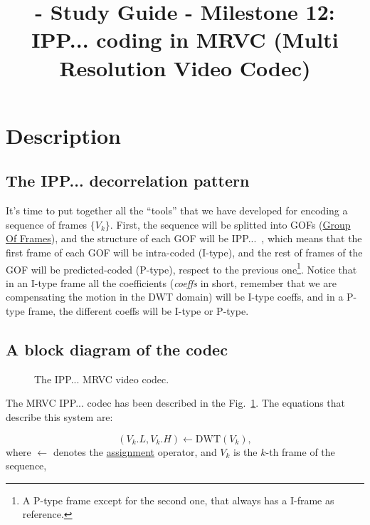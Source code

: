 
\title{\SM{} - Study Guide - Milestone 12: IPP... coding in MRVC (Multi Resolution Video Codec)}

\maketitle

\tableofcontents

\section{Description}

\subsection{The IPP... decorrelation pattern}
It's time to put together all the ``tools'' that we have developed for
encoding a sequence of frames $\{V_k\}$. First, the sequence will be
splitted into GOFs
(\href{https://en.wikipedia.org/wiki/Group_of_pictures}{Group Of
  Frames}), and the structure of each GOF will be
IPP...~\cite{le1991mpeg}, which means that the first frame of each GOF
will be intra-coded (I-type), and the rest of frames of the GOF will
be predicted-coded (P-type), respect to the previous one\footnote{A
  P-type frame except for the second one, that always has a I-frame as
  reference.}. Notice that in an I-type frame all the coefficients
(\emph{coeffs} in short, remember that we are compensating the motion
in the DWT domain) will be I-type coeffs, and in a P-type frame, the
different coeffs will be I-type or P-type.

\subsection{A block diagram of the codec}

\begin{figure}
  \centering
  \caption{The IPP... MRVC video codec.}
  \label{fig:codec}
\end{figure}

The MRVC IPP... codec has been described in the
Fig.~\ref{fig:codec}. The equations that describe this system are:

\begin{equation}
  (V_k.L, V_k.H) \leftarrow \text{DWT}(V_k),
  \tag{a}
\end{equation}
where $\leftarrow$ denotes the
\href{https://en.wikipedia.org/wiki/Assignment_(computer_science)}{assignment}
operator, and $V_k$ is the $k$-th frame of the sequence,

